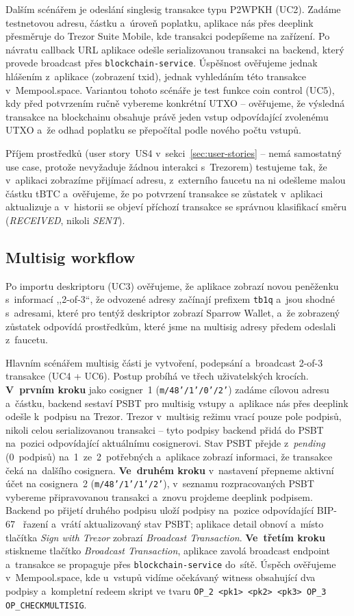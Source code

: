 Dalším scénářem je odeslání singlesig transakce typu P2WPKH (UC2). Zadáme
testnetovou adresu, částku a~úroveň poplatku, aplikace nás přes deeplink
přesměruje do Trezor Suite Mobile, kde transakci podepíšeme na zařízení.
Po návratu callback URL aplikace odešle serializovanou transakci na
backend, který provede broadcast přes \texttt{blockchain-service}. Úspěšnost
ověřujeme jednak hlášením z~aplikace (zobrazení txid), jednak vyhledáním
této transakce v~Mempool.space. Variantou tohoto scénáře je test funkce
coin control (UC5), kdy před potvrzením ručně vybereme konkrétní UTXO --
ověřujeme, že výsledná transakce na blockchainu obsahuje právě jeden vstup
odpovídající zvolenému UTXO a~že odhad poplatku se přepočítal podle nového
počtu vstupů.

Příjem prostředků (user story~US4 v~sekci~\ref{sec:user-stories} --
nemá samostatný use case, protože nevyžaduje žádnou interakci
s~Trezorem) testujeme tak, že v~aplikaci zobrazíme přijímací adresu,
z~externího faucetu na ni odešleme malou částku tBTC a~ověřujeme,
že po potvrzení transakce se zůstatek v~aplikaci aktualizuje
a~v~historii se objeví příchozí transakce se správnou klasifikací
směru (\emph{RECEIVED}, nikoli \emph{SENT}).

\subsection{Multisig workflow}
\label{subsec:scenare-multisig}

Po importu deskriptoru (UC3) ověřujeme, že
aplikace zobrazí novou peněženku s~informací ,,2-of-3``, že odvozené adresy
začínají prefixem \texttt{tb1q} a~jsou shodné s~adresami, které pro tentýž
deskriptor zobrazí Sparrow Wallet, a~že zobrazený zůstatek odpovídá
prostředkům, které jsme na multisig adresy předem odeslali z~faucetu.

Hlavním scénářem multisig části je vytvoření, podepsání a~broadcast 2-of-3
transakce (UC4 + UC6). Postup probíhá ve třech uživatelských krocích.
\textbf{V~prvním kroku} jako cosigner~1 (\texttt{m/48'/1'/0'/2'})
zadáme cílovou adresu a~částku, backend sestaví PSBT pro multisig
vstupy a~aplikace nás přes deeplink odešle k~podpisu na Trezor.
Trezor v~multisig režimu vrací pouze pole podpisů, nikoli celou
serializovanou transakci -- tyto podpisy backend přidá do PSBT na~pozici
odpovídající aktuálnímu cosignerovi. Stav PSBT přejde z~\emph{pending}
(0~podpisů) na~1~ze~2~potřebných a~aplikace zobrazí informaci, že
transakce čeká na~dalšího cosignera. \textbf{Ve~druhém kroku}
v~nastavení přepneme aktivní účet na cosignera~2
(\texttt{m/48'/1'/1'/2'}), v~seznamu rozpracovaných PSBT vybereme
připravovanou transakci a~znovu projdeme deeplink podpisem. Backend
po přijetí druhého podpisu uloží podpisy na~pozice odpovídající
BIP-67~\cite{BIP67} řazení a~vrátí aktualizovaný stav PSBT; aplikace
detail obnoví a~místo tlačítka \emph{Sign with Trezor} zobrazí
\emph{Broadcast Transaction}. \textbf{Ve~třetím kroku} stiskneme
tlačítko \emph{Broadcast Transaction}, aplikace zavolá broadcast
endpoint a~transakce se propaguje přes \texttt{blockchain-service}
do~sítě. Úspěch ověřujeme v~Mempool.space,
kde u~vstupů vidíme očekávaný witness
obsahující dva podpisy a~kompletní redeem skript ve tvaru
\texttt{OP\_2~<pk1>~<pk2>~<pk3>~OP\_3 OP\_CHECKMULTISIG}.


